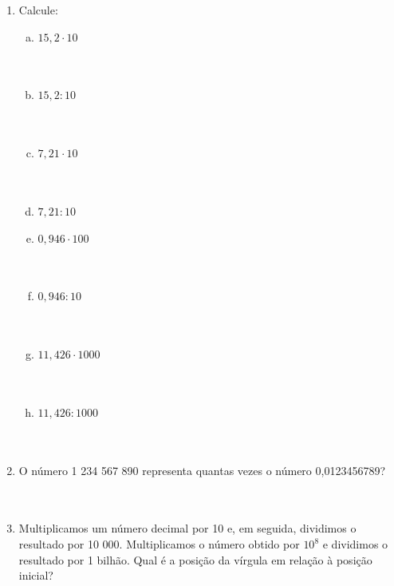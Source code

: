 \documentclass[a4paper,14pt]{article}
\begin{document}
\begin{multicols}{2}
\begin{enumerate}
\begin{enumerate}[a)]
    			\end{enumerate}
    			\item Calcule:
    			\begin{enumerate}[a)]
    				\item $15,2 \cdot 10$ \\\\\\
    				\item $15,2 : 10$ \\\\\\
    				\item $7,21 \cdot 10$ \\\\\\
    				\item $7,21 : 10$ \\
    				\item $0,946 \cdot 100$ \\\\\\
    				\item $0,946 : 10$ \\\\\\
    				\item $11,426 \cdot 1 000$ \\\\\\
    				\item $11,426 : 1 000$ \\\\\\
    			\end{enumerate}
    			\item O número 1 234 567 890 representa quantas vezes o número 0,0123456789? \\\\\\
    			\item Multiplicamos um número decimal por 10 e, em seguida, dividimos o resultado por 10 000. Multiplicamos o número obtido por $10^8$ e dividimos o resultado por 1 bilhão. Qual é a posição da vírgula em relação à posição inicial?
    		\end{enumerate}

\end{multicols}
\end{document}
